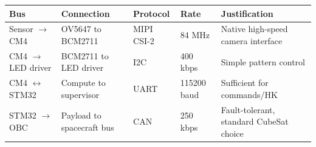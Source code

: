 \begin{longtable}{L{3cm}L{3.5cm}L{3cm}L{2cm}L{4cm}}
\toprule
\textbf{Bus} & \textbf{Connection} & \textbf{Protocol} & \textbf{Rate} & \textbf{Justification} \\
\midrule
Sensor $\rightarrow$ CM4 & OV5647 to BCM2711 & MIPI CSI-2 & 84 MHz & Native high-speed camera interface \\
CM4 $\rightarrow$ LED driver & BCM2711 to LED driver & I2C & 400 kbps & Simple pattern control \\
CM4 $\leftrightarrow$ STM32 & Compute to supervisor & UART & 115200 baud & Sufficient for commands/HK \\
STM32 $\rightarrow$ OBC & Payload to spacecraft bus & CAN & 250 kbps & Fault-tolerant, standard CubeSat choice \\
\bottomrule
\end{longtable}
